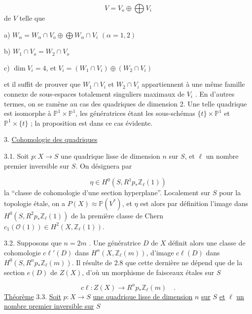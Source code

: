 \begin{equation*}
V = V_o \oplus \bigoplus V_i
\end{equation*}
de $V$ telle que

a) \quad $W_\alpha = W_\alpha \cap V_o \oplus \bigoplus W_\alpha \cap V_i$ \qquad $(\alpha = 1,2)$

b) \quad $W_1 \cap V_o = W_2 \cap V_o$

c) \quad $\dim V_i = 4$, et $V_i = (W_1 \cap V_i) \oplus (W_2 \cap V_i)$

et il suffit de prouver que $W_1 \cap V_i$ et $W_2 \cap V_i$ appartiennent à une même famille connexe de sous-espaces totalement singuliers maximaux de $V_i$ . En d'autres termes, on se ramène au cas des quadriques de dimension 2. Une
telle quadrique est isomorphe à $\mathbb{P}^1 \times \mathbb{P}^1$, les génératrices étant les sous-schémas $\{t\} \times \mathbb{P}^1$ et $\mathbb{P}^1 \times \{t\}$ ; la proposition est dans ce cas évidente.


3. \underline{Cohomologie des quadriques}

3.1. Soit $p : X \longrightarrow S$ une quadrique lisse de dimension $n$ sur $S$, et $\ell$ un nombre premier inversible sur $S$. On désignera par

\begin{equation*}
\eta \in H^0(S, R^1 p_* \mathbb{Z}_\ell(1))
\end{equation*}
la ``classe de cohomologie d'une section hyperplane''. Localement sur $S$ pour la topologie étale, on a $P(X) \approx \mathbb{P}(V^*)$, et $\eta$ est alors par définition l'image dans $H^0(S, R^2 p_* \mathbb{Z}_\ell(1))$ de la première classe de Chern $c_1(\mathcal{O}(1)) \in H^2(X, \mathbb{Z}_\ell(1))$.

3.2. Supposons que $n = 2m$ . Une génératrice $D$ de $X$ définit alors une classe de cohomologie $c\ell'(D)$ dans $H^n(X, \mathbb{Z}_\ell(m))$, d'image $c\ell(D)$ dans $H^0(S,R^n p_* \mathbb{Z}_\ell(m))$. Il résulte de 2.8 que cette dernière ne dépend que de la section $e(D)$ de $Z(X)$, d'où un morphisme de faisceaux étales sur $S$

\begin{equation}\tag{3.2.1}
c\ell : Z(X) \longrightarrow R^n p_* \mathbb{Z}_\ell(m) \quad .
\end{equation}
\underline{Théorème} 3.3. \underline{Soit} $p : X \longrightarrow S$ \underline{une quadrique lisse de dimension} $n$ \underline{sur} $S$ \underline{et} $\ell$ \underline{un nombre premier inversible sur} $S$

